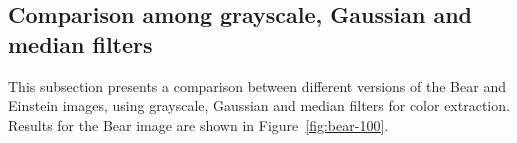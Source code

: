 \documentclass[]{IEEEtran}
\begin{document}


\subsection{Comparison among grayscale, Gaussian and median filters}

This subsection presents a comparison between different versions of the Bear and Einstein images, using grayscale, Gaussian and median filters for color extraction. Results for the Bear image are shown in Figure~\ref{fig:bear-100}.

\end{document}

